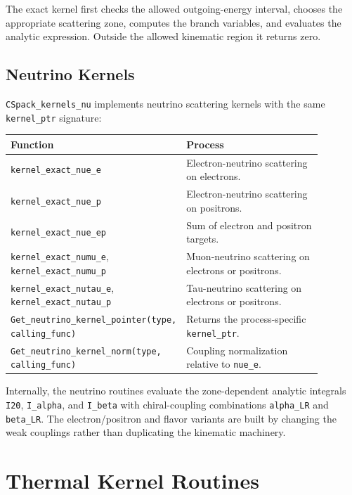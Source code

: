 \documentclass[11pt]{article}
\begin{document}
The exact kernel first checks the allowed outgoing-energy interval, chooses the
appropriate scattering zone, computes the branch variables, and evaluates the
analytic expression. Outside the allowed kinematic region it returns zero.

\subsection{Neutrino Kernels}

\texttt{CSpack\_kernels\_nu} implements neutrino scattering kernels with the
same \texttt{kernel\_ptr} signature:
\begin{center}
\small
\begin{tabular}{L{0.39\linewidth}L{0.49\linewidth}}
\toprule
Function & Process \\
\midrule
\texttt{kernel\_exact\_nue\_e} & Electron-neutrino scattering on electrons. \\
\texttt{kernel\_exact\_nue\_p} & Electron-neutrino scattering on positrons. \\
\texttt{kernel\_exact\_nue\_ep} & Sum of electron and positron targets. \\
\texttt{kernel\_exact\_numu\_e}, \texttt{kernel\_exact\_numu\_p} & Muon-neutrino scattering on electrons or positrons. \\
\texttt{kernel\_exact\_nutau\_e}, \texttt{kernel\_exact\_nutau\_p} & Tau-neutrino scattering on electrons or positrons. \\
\texttt{Get\_neutrino\_kernel\_pointer(type, calling\_func)} & Returns the process-specific \texttt{kernel\_ptr}. \\
\texttt{Get\_neutrino\_kernel\_norm(type, calling\_func)} & Coupling normalization relative to \texttt{nue\_e}. \\
\bottomrule
\end{tabular}
\end{center}

Internally, the neutrino routines evaluate the zone-dependent analytic
integrals \texttt{I20}, \texttt{I\_alpha}, and \texttt{I\_beta} with
chiral-coupling combinations \texttt{alpha\_LR} and \texttt{beta\_LR}. The
electron/positron and flavor variants are built by changing the weak couplings
rather than duplicating the kinematic machinery.

\section{Thermal Kernel Routines}
\end{document}
